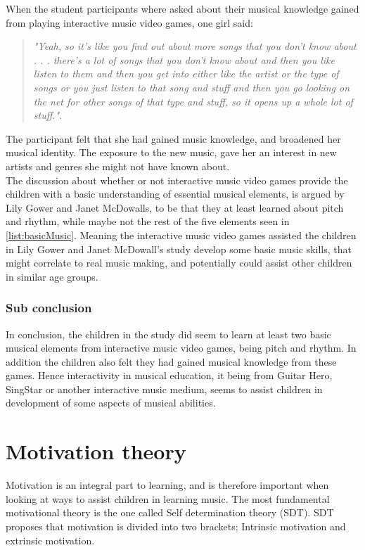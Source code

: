 When the student participants where asked about their musical knowledge gained from playing interactive music video games, one girl said:
\begin{quote}
	\textit{"Yeah, so it’s like you find out about more songs that you don’t know about . . . there’s a lot of songs that you don’t know about and then you like listen to them and then you get into either like the artist or the type of songs or you just listen to that song and stuff and then you go looking on the net for other songs of that type and stuff, so it opens up a whole lot of stuff."}\cite[p.~100]{interactiveMusicVideoGames}.\\
\end{quote}	
The participant felt that she had gained music knowledge, and broadened her musical identity. The exposure to the new music, gave her an interest in new artists and genres she might not have known about.\\

The discussion about whether or not interactive music video games provide the children with a basic understanding of essential musical elements, is argued by Lily Gower and Janet McDowalls, to be that they at least learned about pitch and rhythm, while maybe not the rest of the five elements seen in \autoref{list:basicMusic}. Meaning the interactive music video games assisted the children in Lily Gower and Janet McDowall's study develop some basic music skills, that might correlate to real music making\cite[p.~99]{interactiveMusicVideoGames}, and potentially could assist other children in similar age groups.

\subsubsection*{Sub conclusion}
In conclusion, the children in the study\cite{interactiveMusicVideoGames} did seem to learn at least two basic musical elements from interactive music video games, being pitch and rhythm. In addition the children also felt they had gained musical knowledge from these games. Hence interactivity in musical education, it being from Guitar Hero, SingStar or another interactive music medium, seems to assist children in development of some aspects of musical abilities.

\section{Motivation theory}
Motivation is an integral part to learning\cite{motivationGameDesign}, and is therefore important when looking at ways to assist children in learning music. The most fundamental motivational theory is the one called Self determination theory (SDT)\cite{SDT}. SDT proposes that motivation is divided into two brackets; Intrinsic motivation and extrinsic motivation\cite{SDT}. 


